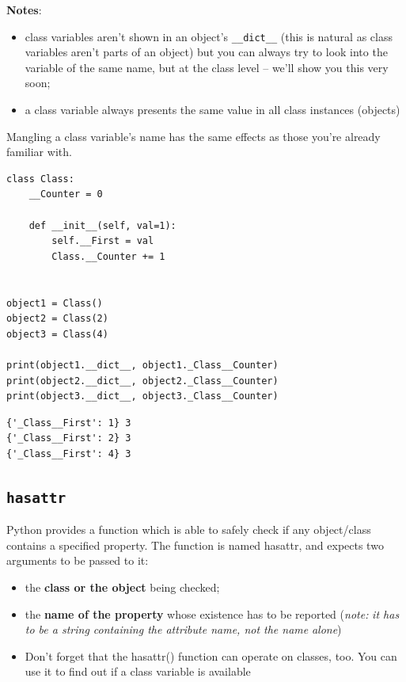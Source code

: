 \documentclass[11pt]{article}
\begin{document}
\textbf{Notes}:
\begin{itemize}
\item class variables aren’t shown in an object’s \texttt{\_\_dict\_\_} (this is
natural as class variables aren’t parts of an object) but you can
always try to look into the variable of the same name, but at the
class level – we’ll show you this very soon;
\item a class variable always presents the same value in all class
instances (objects)
\end{itemize}

Mangling a class variable’s name has the same effects as those you’re
already familiar with.

\begin{verbatim}
class Class:
	__Counter = 0

	def __init__(self, val=1):
		self.__First = val
		Class.__Counter += 1


object1 = Class()
object2 = Class(2)
object3 = Class(4)

print(object1.__dict__, object1._Class__Counter)
print(object2.__dict__, object2._Class__Counter)
print(object3.__dict__, object3._Class__Counter)

\end{verbatim}

\begin{verbatim}
{'_Class__First': 1} 3
{'_Class__First': 2} 3
{'_Class__First': 4} 3
\end{verbatim}


\newpage

\subsection{\texttt{hasattr}}
\label{sec:org1ab997c}
Python provides a function which is able to safely check if any
object/class contains a specified property. The function is named
hasattr, and expects two arguments to be passed to it:
\begin{itemize}
\item the \textbf{class or the object} being checked;
\item the \textbf{name of the property} whose existence has to be reported (\emph{note:}
\emph{it has to be a string containing the attribute name, not the name}
\emph{alone})
\item Don’t forget that the hasattr() function can operate on classes,
too. You can use it to find out if a class variable is available
\end{itemize}
\end{document}
